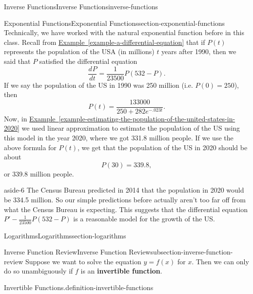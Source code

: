 \documentclass[oneside,10pt,]{book}
\newcommand{\terminology}[1]{\textbf{#1}}
\numberwithin{equation}{section}
\newcommand{\dv}[3][]{\dfrac{d^{#1} #2}{d #3^{#1}}}
\begin{document}
\begin{chapterptx}{Inverse Functions}{}{Inverse Functions}{}{}{inverse-functions}
\begin{sectionptx}{Exponential Functions}{}{Exponential Functions}{}{}{section-exponential-functions}
Technically, we have worked with the natural exponential function before in this class. Recall from \hyperref[example-a-differential-equation]{Example~\ref{example-a-differential-equation}} that if \(P(t)\) represents the population of the USA (in millions) \(t\) years after 1990, then we said that \(P\) satisfied the differential equation%
\begin{equation*}
\dv{P}{t} = \frac{1}{23500}P(532 - P).
\end{equation*}
If we say the population of the US in 1990 was 250 million (i.e. \(P(0) = 250\)), then%
\begin{equation*}
P(t) = \frac{133000}{250 + 282e^{-.023t}}.
\end{equation*}
Now, in \hyperref[example-estimating-the-population-of-the-united-states-in-2020]{Example~\ref{example-estimating-the-population-of-the-united-states-in-2020}} we used linear approximation to estimate the population of the US using this model in the year 2020, where we got 331.8 million people. If we use the above formula for \(P(t)\), we get that the population of the US in 2020 should be about%
\begin{equation*}
P(30) = 339.8,
\end{equation*}
or 339.8 million people.%
\begin{aside}{}{aside-6}%
\hypertarget{p-197}{}%
The Census Bureau predicted in 2014 that the population in 2020 would be 334.5 million. So our simple predictions before actually aren't too far off from what the Census Bureau is expecting. This suggests that the differential equation \(P' - \frac{1}{23500}P(532-P)\) is a reasonable model for the growth of the US.%
\end{aside}
\end{sectionptx}
%
%
\typeout{************************************************}
\typeout{************************************************}
%
\begin{sectionptx}{Logarithms}{}{Logarithms}{}{}{section-logarithms}
%
%
\typeout{************************************************}
\typeout{************************************************}
%
\begin{subsectionptx}{Inverse Function Review}{}{Inverse Function Review}{}{}{subsection-inverse-function-review}
\hypertarget{p-198}{}%
Suppose we want to solve the equation \(y = f(x)\) for \(x\). Then we can only do so unambiguously if \(f\) is an \terminology{invertible function}.%
\begin{definition}{Invertible Functions.}{definition-invertible-functions}%

\end{definition}
\end{subsectionptx}
\end{sectionptx}
\end{chapterptx}
\end{document}
